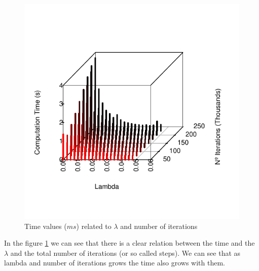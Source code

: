 \documentclass[12]{article}
\begin{document}
    \begin{figure}[H]
    \captionsetup{justification=centering}
    \centering
        \includegraphics[scale=0.45]{Results/data_B_1.pdf}
        \caption{Time values ($ms$) related to $\lambda$ and number of iterations}
        \label{fig:data2}
    \end{figure}
    
In the figure \ref{fig:data2} we can see that there is a clear relation between the time and the $\lambda$ and the total number of iterations (or so called steps). We can see that as lambda and number of iterations grows the time also grows with them.     
    
\end{document}
